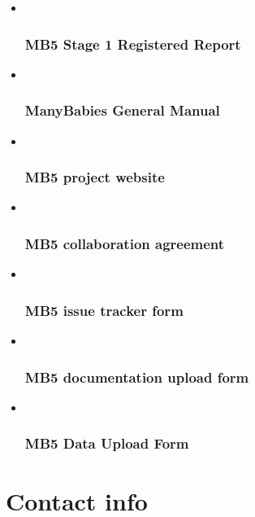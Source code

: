 \documentclass[
]{book}
\begin{document}
\begin{itemize}
\item ~
  \subsubsection*{MB5 Stage 1 Registered Report}\label{mb5-stage-1-registered-report}
\item ~
  \subsubsection*{ManyBabies General Manual}\label{manybabies-general-manual}
\item ~
  \subsubsection*{MB5 project website}\label{mb5-project-website}
\item ~
  \subsubsection*{MB5 collaboration agreement}\label{mb5-collaboration-agreement}
\item ~
  \subsubsection{MB5 issue tracker form}\label{mb5-issue-tracker-form}
\item ~
  \subsubsection{\texorpdfstring{MB5 documentation upload form }{MB5 documentation upload form }}\label{mb5-documentation-upload-form}
\item ~
  \subsubsection{MB5 Data Upload Form}\label{mb5-data-upload-form}
\end{itemize}

\section*{Contact info}\label{contact-info}
\end{document}
